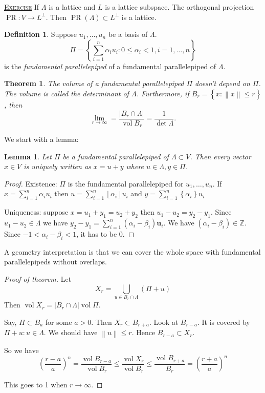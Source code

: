 \documentclass{report}
\newcommand{\Z}{\mathbb{Z}}
\newcommand{\vol}{\operatorname{vol}}
\newcommand{\norm}[1]{\left\| #1 \right\|}
\newcommand{\floor}[1]{\left\lfloor #1 \right\rfloor}
\newcommand{\set}[1]{\left\{ #1 \right\}}
\newcommand{\fancyem}[1]{\underline{\textsc{#1}}}
\newtheorem{theorem}{Theorem}[section]
\newtheorem{lemma}{Lemma}[section]
\theoremstyle{definition}
\newtheorem{definition}{Definition}[section]
\theoremstyle{remark}
\numberwithin{equation}{section}
\begin{document}
\fancyem{Exercise} If $\Lambda$ is a lattice and $L$ is a lattice subspace. The orthogonal projection $\operatorname{PR}: V \to L^{\perp}$. Then $\operatorname{PR}(\Lambda) \subset L^\perp$ is a lattice.

\begin{definition}
    Suppose $u_1, \ldots, u_n$ be a basis of $\Lambda$. 
    \[\Pi=\set{\sum_{i=1}^n \alpha_i u_i: 0 \leq \alpha_i < 1, i = 1, \ldots, n}\] is the \emph{fundamental parallelepiped} of a fundamental parallelepiped of $\Lambda$.
\end{definition}
\begin{theorem}
    The volume of a fundamental parallelepiped $\Pi$ doesn't depend on $\Pi$. The volume is called the determinant of $\Lambda$. Furthermore, if $B_{r} = \set{x: \norm{x} \leq r}$, then \[\lim_{r \to \infty} = \frac{|B_r \cap \Lambda|}{\operatorname{vol}B_r} = \frac{1}{\det \Lambda}.\]
\end{theorem}
We start with a lemma:
\begin{lemma}\label{le:1.1.1}
    Let $\Pi$ be a fundamental parallelepiped of $\Lambda \subset V$. Then every vector $x \in V$ is uniquely written as $x = u + y$ where $u \in \Lambda, y \in \Pi$.
\end{lemma}
\begin{proof}
    Existence: $\Pi$ is the fundamental parallelepiped for $u_1, \ldots, u_n$. If $x = \sum_{i=1}^n \alpha_i u_i$ then $u = \sum_{i=1}^n \floor{\alpha_i} u_i$ and $y = \sum_{i=1}^n \set{\alpha_i} u_i$

    Uniqueness: suppose $x = u_1 + y_1 = u_2 + y_2$ then $u_1 - u_2 = y_2 - y_1$. Since $u_1 - u_2 \in \Lambda$ we have $y_2 - y_1 = \sum_{i=1}^n (\alpha_i - \beta_i)\mathbf{u}_i$. We have $(\alpha_i - \beta_i) \in \Z$. Since $-1 < \alpha_i - \beta_i < 1$, it has to be $0$.
\end{proof}
A geometry interpretation is that we can cover the whole space with fundamental parallelepipeds without overlaps.



\begin{proof}[Proof of theorem]
    Let \[X_{r} = \bigcup_{u \in B_r \cap \Lambda} (\Pi + u)\]
    Then $\operatorname{vol} X_r = |B_r \cap \Lambda| \operatorname{vol}\Pi$.

    Say, $\Pi \subset B_a$ for some $a > 0$. Then $X_r \subset B_{r + a}$.
    Look at $B_{r - a}$. It is covered by $\Pi + u: u \in \Lambda$. We should have $\norm{u} \leq r$. Hence $B_{r - a} \subset X_r$.

    So we have \[\left(\frac{r-a}{a}\right)^n = \frac{\vol B_{r-a}}{\vol B_r} \leq \frac{\vol X_r}{\vol B_r} \leq \frac{\vol B_{r+a}}{B_r} = \left(\frac{r+a}{a}\right)^n\]

    This goes to 1 when $r \to \infty$.
\end{proof}
\end{document}
